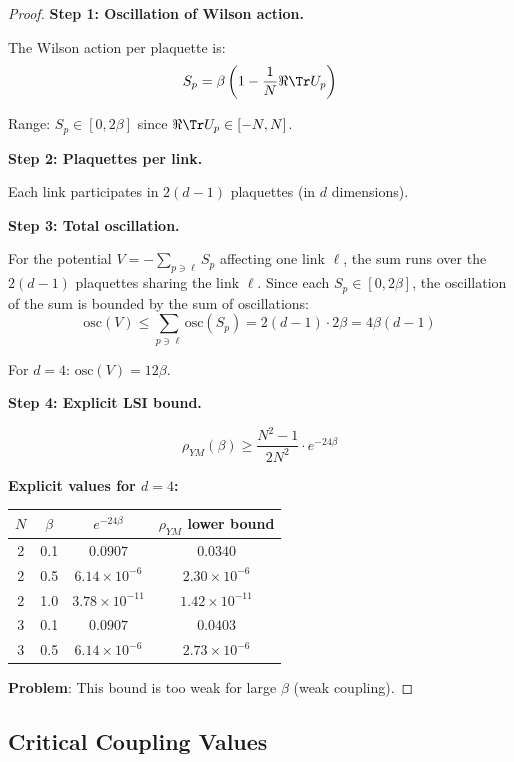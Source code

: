 \begin{proof}
\textbf{Step 1: Oscillation of Wilson action.}

The Wilson action per plaquette is:
\[
S_p = \beta \left(1 - \frac{1}{N}\Re\Tr U_p\right)
\]

Range: $S_p \in [0, 2\beta]$ since $\Re\Tr U_p \in [-N, N]$.

\textbf{Step 2: Plaquettes per link.}

Each link participates in $2(d-1)$ plaquettes (in $d$ dimensions).

\textbf{Step 3: Total oscillation.}

For the potential $V = -\sum_{p \ni \ell} S_p$ affecting one link $\ell$, the sum runs over the $2(d-1)$ plaquettes sharing the link $\ell$.
Since each $S_p \in [0, 2\beta]$, the oscillation of the sum is bounded by the sum of oscillations:
\[
\mathrm{osc}(V) \leq \sum_{p \ni \ell} \mathrm{osc}(S_p) = 2(d-1) \cdot 2\beta = 4\beta(d-1)
\]

For $d=4$: $\mathrm{osc}(V) = 12\beta$.

\textbf{Step 4: Explicit LSI bound.}

\[
\rho_{YM}(\beta) \geq \frac{N^2-1}{2N^2} \cdot e^{-24\beta}
\]

\textbf{Explicit values for $d=4$:}
\begin{center}
\begin{tabular}{|c|c|c|c|}
\hline
$N$ & $\beta$ & $e^{-24\beta}$ & $\rho_{YM}$ lower bound \\
\hline
2 & 0.1 & $0.0907$ & $0.0340$ \\
2 & 0.5 & $6.14 \times 10^{-6}$ & $2.30 \times 10^{-6}$ \\
2 & 1.0 & $3.78 \times 10^{-11}$ & $1.42 \times 10^{-11}$ \\
3 & 0.1 & $0.0907$ & $0.0403$ \\
3 & 0.5 & $6.14 \times 10^{-6}$ & $2.73 \times 10^{-6}$ \\
\hline
\end{tabular}
\end{center}

\textbf{Problem}: This bound is too weak for large $\beta$ (weak coupling).
\end{proof}

\subsection{Critical Coupling Values}

